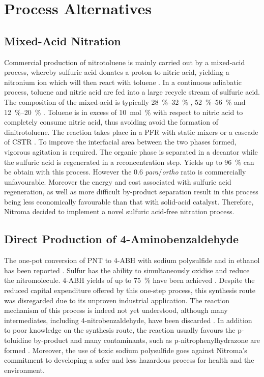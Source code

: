 \section{Process Alternatives}
\label{app:alternatives}

\subsection{Mixed-Acid Nitration}
Commercial production of nitrotoluene is mainly carried out by a mixed-acid process, whereby sulfuric acid donates a proton to nitric acid, yielding a nitronium ion which will then react with toluene \cite{halder_nitration_2007}. In a continuous adiabatic process, toluene and nitric acid are fed into a large recycle stream of sulfuric acid. The composition of the mixed-acid is typically \SIrange{28}{32}{\percent} , \SIrange{52}{56}{\percent}  and \SIrange{12}{20}{\percent}  \cite{dugal_nitrobenzene_2005}. Toluene is in excess of \SI{10}{mol\percent} with respect to nitric acid to completely consume nitric acid, thus avoiding avoid the formation of dinitrotoluene. The reaction takes place in a PFR with static mixers or a cascade of CSTR \cite{dugal_nitrobenzene_2005}. To improve the interfacial area between the two phases formed, vigorous agitation is required. The organic phase is separated in a decantor while the sulfuric acid is regenerated in a reconcentration step. Yields up to \SI{96}{\percent} can be obtain with this process. However the 0.6 \textit{para}/\textit{ortho} ratio is commercially unfavourable. Moreover the energy and cost associated with sulfuric acid regeneration, as well as more difficult by-product separation result in this process being less economically favourable than that with solid-acid catalyst. Therefore, Nitroma decided to implement a novel sulfuric acid-free nitration process.

\subsection{Direct Production of 4-Aminobenzaldehyde}
The one-pot conversion of PNT to 4-ABH with sodium polysulfide and  in ethanol has been reported \cite{ogata_mechanism_1979}. Sulfur has the ability to simultaneously oxidise and reduce the nitromolecule. 4-ABH yields of up to \SI{75}{\percent} have been achieved \cite{beard_preparation_1944}. Despite the reduced capital expenditure offered by this one-step process, this synthesis route was disregarded due to its unproven industrial application. The reaction mechanism of this process is indeed not yet understood, although many intermediates, including 4-nitrobenzaldehyde, have been discarded \cite{ogata_mechanism_1979}. In addition to poor knowledge on the synthesis route, the reaction usually favours the p-toluidine by-product and many contaminants, such as p-nitrophenylhydrazone are formed \cite{beard_preparation_1944}. Moreover, the use of toxic sodium polysulfide goes against Nitroma's commitment to developing a safer and less hazardous process for health and the environment.


